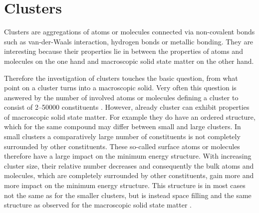 \chapter{Clusters}

Clusters are aggregations of atoms or molecules connected via non-covalent
bonds such as van-der-Waals interaction, hydrogen bonds or metallic bonding.
They are interesting
because their properties lie in between the properties of
atoms and molecules on the one hand and macroscopic solid state matter
on the other hand.

Therefore the investigation of clusters touches the basic question, from what point
on a cluster turns into a macroscopic solid.
Very often this question is answered by the number of involved atoms or molecules
defining a cluster to consist of 2--50000 constituents \cite{Bjorneholm09}.
However, already cluster can exhibit properties of macroscopic solid
state matter. For example they do have an ordered structure, which for the same
compound may differ between small and large clusters. In small clusters a
comparatively large number of constituents is not completely surrounded
by other constituents. These so-called surface atoms or molecules therefore
have a large impact on the minimum energy structure. With increasing cluster
size, their relative number decreases and consequently the bulk atoms and molecules,
which are completely surrounded by other constituents,
gain more and more impact on the minimum energy structure. This structure is
in most cases not the same as for the smaller clusters, but is instead
space filling and the
same structure as observed for the macroscopic solid state matter
\cite{Martin96,Hartke02}.

